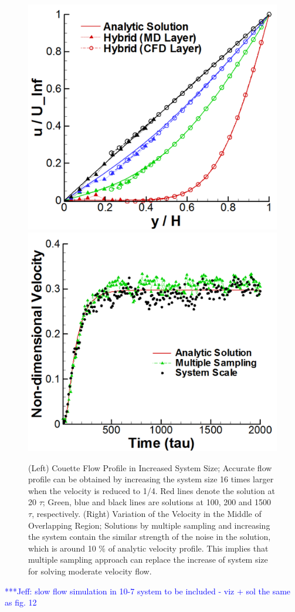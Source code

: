 \documentclass[preprint,12pt]{elsarticle}
\newcommand{\skonote}[1]{ {\textcolor{blue} { ***Jeff: #1 }}}
\newcommand{\skonote}[1]{}
\begin{document}
\begin{figure}
\centering
\includegraphics[width=0.6\linewidth]{Couette_025_Scale16.pdf}
\hskip 1cm
\includegraphics[width=0.6\linewidth]{Couette_025_Temporal_Multiset_VS_Scaleup.pdf}
\vskip-0.2cm
\caption{\small (Left) Couette Flow Profile in Increased System Size; Accurate flow profile can be obtained by increasing the system size 16 times larger when the velocity is reduced to 1/4. Red lines denote the solution at 20 $\tau$; Green, blue and black lines are solutions at 100, 200 and 1500 $\tau$, respectively. (Right) Variation of the Velocity in the Middle of Overlapping Region; Solutions by multiple sampling and increasing the system contain the similar strength of the noise in the solution, which is around 10 $\%$ of analytic velocity profile. This implies that multiple sampling approach can replace the increase of system size for solving moderate velocity flow.}
\label{increase_system}
\end{figure}


\skonote{slow flow simulation in 10-7 system to be included - viz + sol the same as fig. 12}
\end{document}
